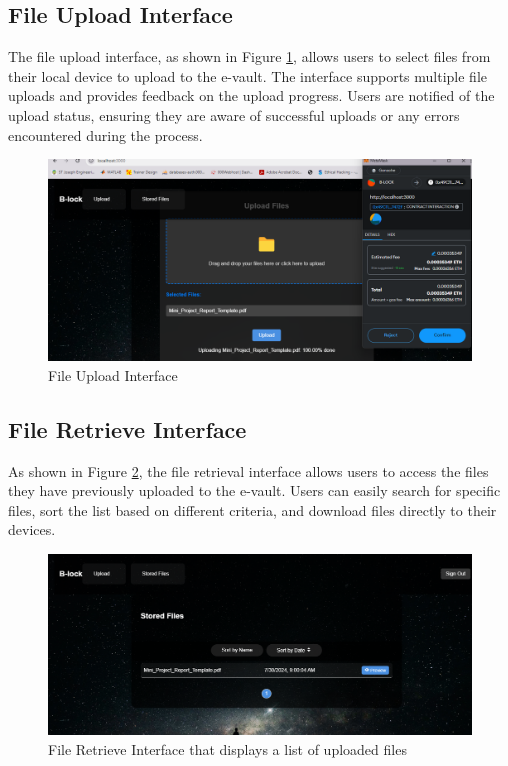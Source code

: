 \documentclass[12pt,a4paper]{report}
\begin{document}
\subsection{File Upload Interface}
The file upload interface, as shown in Figure \ref{fig:fileupload}, allows users to select files from their local device to upload to the e-vault. The interface supports multiple file uploads and provides feedback on the upload progress. Users are notified of the upload status, ensuring they are aware of successful uploads or any errors encountered during the process.

\begin{figure}[hbtp]
    \centering
    \includegraphics[scale=0.4]{./pic/fileupload.png}
    \caption{File Upload Interface}
    \label{fig:fileupload}
\end{figure}

\subsection{File Retrieve Interface}
As shown in Figure \ref{fig:retrieve}, the file retrieval interface allows users to access the files they have previously uploaded to the e-vault. Users can easily search for specific files, sort the list based on different criteria, and download files directly to their devices.

\begin{figure}[hbtp]
    \centering
    \includegraphics[scale=0.4]{./pic/retrieve.png}
    \caption{File Retrieve Interface that displays a list of uploaded files}
    \label{fig:retrieve}
\end{figure}
\end{document}
